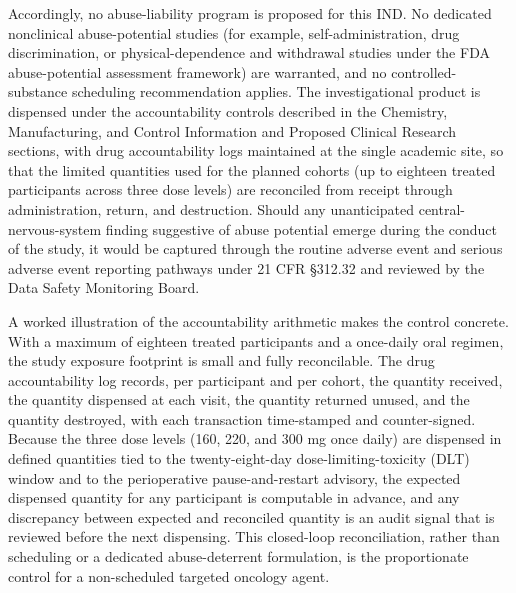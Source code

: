 Accordingly, no abuse-liability program is proposed for this IND. No dedicated
nonclinical abuse-potential studies (for example, self-administration, drug
discrimination, or physical-dependence and withdrawal studies under the FDA
abuse-potential assessment framework) are warranted, and no controlled-substance
scheduling recommendation applies. The investigational product is dispensed under
the accountability controls described in the Chemistry, Manufacturing, and Control
Information and Proposed Clinical Research sections, with drug accountability logs
maintained at the single academic site, so that the limited quantities used for the
planned cohorts (up to eighteen treated participants across three dose levels) are
reconciled from receipt through administration, return, and destruction. Should any
unanticipated central-nervous-system finding suggestive of abuse potential emerge
during the conduct of the study, it would be captured through the routine adverse
event and serious adverse event reporting pathways under 21 CFR \S 312.32 and
reviewed by the Data Safety Monitoring Board.

A worked illustration of the accountability arithmetic makes the control concrete.
With a maximum of eighteen treated participants and a once-daily oral regimen, the
study exposure footprint is small and fully reconcilable. The drug accountability
log records, per participant and per cohort, the quantity received, the quantity
dispensed at each visit, the quantity returned unused, and the quantity destroyed,
with each transaction time-stamped and counter-signed. Because the three dose levels
(160, 220, and 300 mg once daily) are dispensed in defined quantities tied to the
twenty-eight-day dose-limiting-toxicity (DLT) window and to the perioperative
pause-and-restart advisory, the expected dispensed quantity for any participant is
computable in advance, and any discrepancy between expected and reconciled quantity
is an audit signal that is reviewed before the next dispensing. This closed-loop
reconciliation, rather than scheduling or a dedicated abuse-deterrent formulation,
is the proportionate control for a non-scheduled targeted oncology agent.

